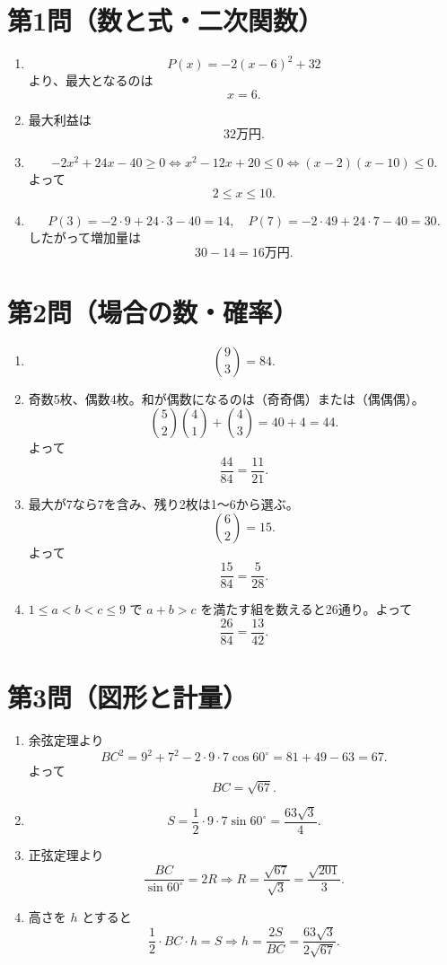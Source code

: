 \documentclass[a4paper,12pt]{jsarticle}
\begin{document}
\section*{第1問（数と式・二次関数）}
\begin{enumerate}[label=\arabic*.]
  \item
  \[
  P(x)=-2(x-6)^2+32
  \]
  より、最大となるのは
  \[
  x=6.
  \]
  \item 最大利益は
  \[
  32\text{万円}.
  \]
  \item
  \[
  -2x^2+24x-40\ge0
  \iff x^2-12x+20\le0
  \iff (x-2)(x-10)\le0.
  \]
  よって
  \[
  2\le x\le10.
  \]
  \item
  \[
  P(3)=-2\cdot9+24\cdot3-40=14,
  \quad
  P(7)=-2\cdot49+24\cdot7-40=30.
  \]
  したがって増加量は
  \[
  30-14=16\text{万円}.
  \]
\end{enumerate}

\section*{第2問（場合の数・確率）}
\begin{enumerate}[label=\arabic*.]
  \item
  \[
  \binom{9}{3}=84.
  \]
  \item 奇数5枚、偶数4枚。和が偶数になるのは（奇奇偶）または（偶偶偶）。
  \[
  \binom52\binom41+\binom43=40+4=44.
  \]
  よって
  \[
  \frac{44}{84}=\frac{11}{21}.
  \]
  \item 最大が7なら7を含み、残り2枚は1～6から選ぶ。
  \[
  \binom62=15.
  \]
  よって
  \[
  \frac{15}{84}=\frac{5}{28}.
  \]
  \item $1\le a<b<c\le9$ で $a+b>c$ を満たす組を数えると26通り。よって
  \[
  \frac{26}{84}=\frac{13}{42}.
  \]
\end{enumerate}

\section*{第3問（図形と計量）}
\begin{enumerate}[label=\arabic*.]
  \item 余弦定理より
  \[
  BC^2=9^2+7^2-2\cdot9\cdot7\cos60^\circ
  =81+49-63=67.
  \]
  よって
  \[
  BC=\sqrt{67}.
  \]
  \item
  \[
  S=\frac12\cdot9\cdot7\sin60^\circ
  =\frac{63\sqrt3}{4}.
  \]
  \item 正弦定理より
  \[
  \frac{BC}{\sin60^\circ}=2R
  \Rightarrow
  R=\frac{\sqrt{67}}{\sqrt3}=\frac{\sqrt{201}}{3}.
  \]
  \item 高さを $h$ とすると
  \[
  \frac12\cdot BC\cdot h=S
  \Rightarrow
  h=\frac{2S}{BC}=\frac{63\sqrt3}{2\sqrt{67}}.
  \]
\end{enumerate}
\end{document}
